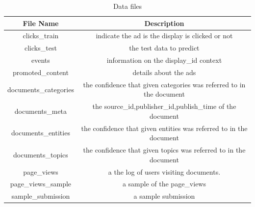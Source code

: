 \documentclass[fleqn,10pt]{SelfArx} %
\begin{document}
\begin{table}[!htbp]
\begin{center}
  \begin{tabular}{ c|c }\hline \hline
  File Name  & Description    \\ \hline \hline
  clicks\_train & indicate the ad is the display is clicked or not\\
  clicks\_test & the test data to predict \\
  events  &  information on the display\_id context\\
  promoted\_content &  details about the ads \\
  documents\_categories & the confidence that given categories was referred to in the document\\
  documents\_meta & the source\_id,publisher\_id,publish\_time of the document\\
  documents\_entities & the confidence that given entities was referred to in the document\\
  documents\_topics & the confidence that given topics was referred to in the document\\
  page\_views &  a the log of users visiting documents.  \\
  page\_views\_sample & a sample of the page\_views\\
  sample\_submission & a sample submission \\  \hline\hline
   \end{tabular}
\end{center}
\caption{Data files}\label{tab:files}
\end{table}
\end{document}
